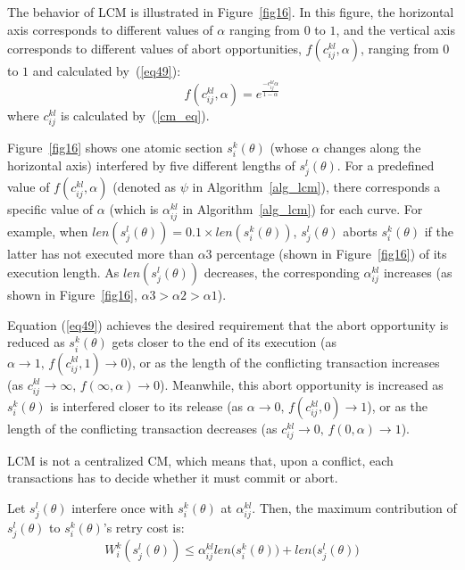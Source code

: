 The behavior of LCM is illustrated in Figure~\ref{fig16}. In this figure, the horizontal axis corresponds to different values of $\alpha$ ranging from $0$ to $1$, and the vertical axis corresponds to different values of abort opportunities, $f(c_{ij}^{kl},\alpha)$, ranging from $0$ to $1$ and calculated by~(\ref{eq49}):
\begin{equation}
f(c_{ij}^{kl},\alpha)=e^{\frac{-c_{ij}^{kl}\alpha}{1-\alpha}}
\label{eq49}\end{equation}
where $c_{ij}^{kl}$ is calculated by~(\ref{cm_eq}).

Figure~\ref{fig16} shows one atomic section $s_i^k(\theta)$ (whose $\alpha$ changes along the horizontal axis) interfered by five different lengths of $s_j^l(\theta)$.
For a predefined value of $f(c_{ij}^{kl},\alpha)$ (denoted as $\psi$ in Algorithm~\ref{alg_lcm}), there corresponds a specific value of $\alpha$ (which is $\alpha_{ij}^{kl}$ in Algorithm~\ref{alg_lcm}) for each curve. For example, when $len(s_j^l(\theta))=0.1 \times len(s_i^k(\theta))$, $s_j^l(\theta)$ aborts $s_i^k(\theta)$ if the latter has not executed more than $\alpha3$ percentage (shown in Figure~\ref{fig16}) of its execution length. As $len(s_{j}^{l}(\theta))$ decreases, the corresponding $\alpha_{ij}^{kl}$ increases (as shown in Figure~\ref{fig16}, $\alpha3>\alpha2>\alpha1$).

Equation (\ref{eq49}) achieves the desired requirement that the abort opportunity is reduced as $s_{i}^{k}(\theta)$ gets
closer to the end of its execution (as $\alpha\rightarrow1,\, f(c_{ij}^{kl},1)\rightarrow0$),
or as the length of the conflicting transaction increases (as $c_{ij}^{kl}\rightarrow\infty,\, f(\infty,\alpha)\rightarrow0$).
Meanwhile, this abort opportunity is increased as $s_{i}^{k}(\theta)$
is interfered closer to its release (as $\alpha\rightarrow0,\, f(c_{ij}^{kl},0)\rightarrow1$),
or as the length of the conflicting transaction decreases (as $c_{ij}^{kl}\rightarrow0,\, f(0,\alpha)\rightarrow1$).

LCM is not a centralized CM, which means that, upon a conflict, each transactions has to decide whether it must commit or abort. 

\begin{clm}
\label{LCM_higher_rc}
Let $s_{j}^{l}(\theta)$ interfere once with $s_{i}^{k}(\theta)$ at $\alpha_{ij}^{kl}$. Then, the maximum contribution of $s_{j}^{l}(\theta)$ to 
$s_{i}^{k}(\theta)$'s 
retry cost is:
\begin{equation}
W_i^k(s_j^l(\theta))\le \alpha_{ij}^{kl}len\Big(s_{i}^{k}(\theta)\Big)+len\Big(s_{j}^{l}(\theta)\Big)\label{eq47}\end{equation}
\end{clm}

